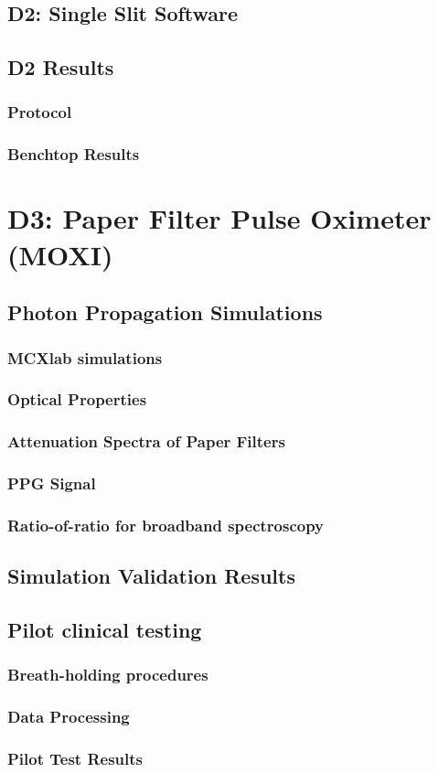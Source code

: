     \subsection{D2: Single Slit Software}
    \subsection{D2 Results}
        \subsubsection{Protocol}
        \subsubsection{Benchtop Results}



\section{D3: Paper Filter Pulse Oximeter (MOXI)}
    \subsection{Photon Propagation Simulations}
        \subsubsection{MCXlab simulations}
        \subsubsection{Optical Properties}
        \subsubsection{Attenuation Spectra of Paper Filters}
        \subsubsection{PPG Signal}
        \subsubsection{Ratio-of-ratio for broadband spectroscopy}
    \subsection{Simulation Validation Results}
    \subsection{Pilot clinical testing}
        \subsubsection{Breath-holding procedures}
        \subsubsection{Data Processing}
        \subsubsection{Pilot Test Results}



